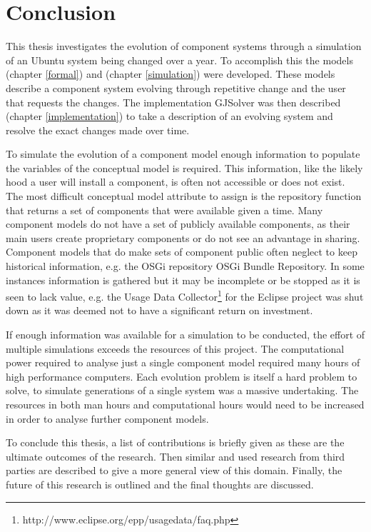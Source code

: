 \chapter{Conclusion}
\label{conclusion}
This thesis investigates the evolution of component systems through a simulation of an Ubuntu system being changed over a year.
To accomplish this the models \modelname (chapter \ref{formal}) and \usermodel (chapter \ref{simulation}) were developed.
These models describe a component system evolving through repetitive change and the user that requests the changes.
The implementation GJSolver was then described (chapter \ref{implementation}) to take a description of an evolving system and resolve the exact changes made over time.






To simulate the evolution of a component model enough information to populate the variables of the conceptual model is required.
This information, like the likely hood a user will install a component, is often not accessible or does not exist.
The most difficult conceptual model attribute to assign is the repository function that returns a set of components that were available given a time. 
Many component models do not have a set of publicly available components, as their main users create proprietary components or do not see an advantage in sharing.
Component models that do make sets of component public often neglect to keep historical information, e.g. the OSGi repository OSGi Bundle Repository.
In some instances information is gathered but it may be incomplete or be stopped as it is seen to lack value,  
e.g. the Usage Data Collector\footnote{http://www.eclipse.org/epp/usagedata/faq.php} for the Eclipse project was shut down as it was deemed not to have a significant return on investment.  

If enough information was available for a simulation to be conducted, the effort of multiple simulations exceeds the resources of this project.
The computational power required to analyse just a single component model required many hours of high performance computers.
Each evolution problem is itself a hard problem to solve, to simulate generations of a single system was a massive undertaking.
The resources in both man hours and computational hours would need to be increased in order to analyse further component models.


To conclude this thesis, a list of contributions is briefly given as these are the ultimate outcomes of the research.
Then similar and used research from third parties are described to give a more general view of this domain.
Finally, the future of this research is outlined and the final thoughts are discussed.

